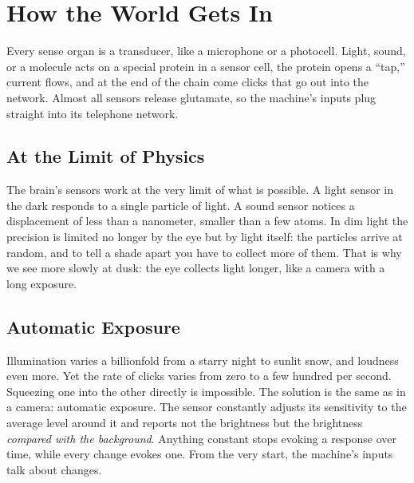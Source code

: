 \chapter{How the World Gets In}

Every sense organ is a transducer, like a microphone or a photocell. Light, sound, or a molecule acts on a special protein in a sensor cell, the protein opens a ``tap,'' current flows, and at the end of the chain come clicks that go out into the network. Almost all sensors release glutamate, so the machine's inputs plug straight into its telephone network.

\section*{At the Limit of Physics}

The brain's sensors work at the very limit of what is possible. A light sensor in the dark responds to a single particle of light. A sound sensor notices a displacement of less than a nanometer, smaller than a few atoms. In dim light the precision is limited no longer by the eye but by light itself: the particles arrive at random, and to tell a shade apart you have to collect more of them. That is why we see more slowly at dusk: the eye collects light longer, like a camera with a long exposure.

\section*{Automatic Exposure}

Illumination varies a billionfold from a starry night to sunlit snow, and loudness even more. Yet the rate of clicks varies from zero to a few hundred per second. Squeezing one into the other directly is impossible. The solution is the same as in a camera: automatic exposure. The sensor constantly adjusts its sensitivity to the average level around it and reports not the brightness but the brightness \emph{compared with the background}. Anything constant stops evoking a response over time, while every change evokes one. From the very start, the machine's inputs talk about changes.

